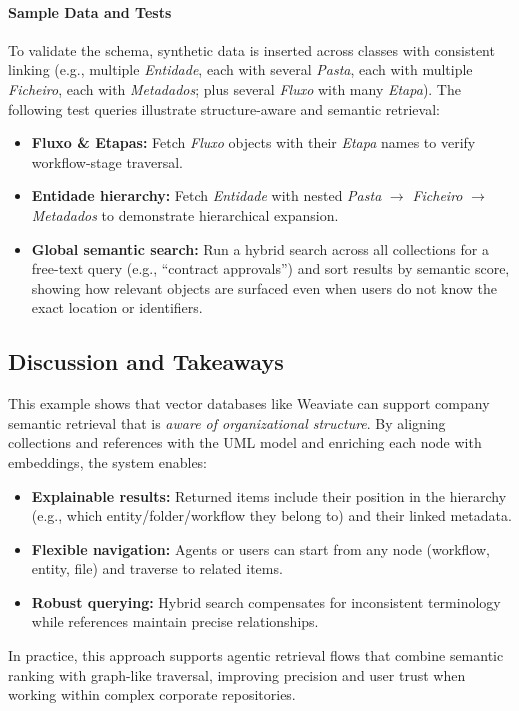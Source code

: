 \paragraph{Sample Data and Tests}
To validate the schema, synthetic data is inserted across classes with consistent linking (e.g., multiple \textit{Entidade}, each with several \textit{Pasta}, each with multiple \textit{Ficheiro}, each with \textit{Metadados}; plus several \textit{Fluxo} with many \textit{Etapa}). The following test queries illustrate structure-aware and semantic retrieval:
\begin{itemize}
    \item \textbf{Fluxo \& Etapas:} Fetch \textit{Fluxo} objects with their \textit{Etapa} names to verify workflow-stage traversal.
    \item \textbf{Entidade hierarchy:} Fetch \textit{Entidade} with nested \textit{Pasta} \(\rightarrow\) \textit{Ficheiro} \(\rightarrow\) \textit{Metadados} to demonstrate hierarchical expansion.
    \item \textbf{Global semantic search:} Run a hybrid search across all collections for a free-text query (e.g., “contract approvals”) and sort results by semantic score, showing how relevant objects are surfaced even when users do not know the exact location or identifiers.
\end{itemize}

\subsection{Discussion and Takeaways}
This example shows that vector databases like Weaviate can support company semantic retrieval that is \emph{aware of organizational structure}. By aligning collections and references with the UML model and enriching each node with embeddings, the system enables:
\begin{itemize}
    \item \textbf{Explainable results:} Returned items include their position in the hierarchy (e.g., which entity/folder/workflow they belong to) and their linked metadata.
    \item \textbf{Flexible navigation:} Agents or users can start from any node (workflow, entity, file) and traverse to related items.
    \item \textbf{Robust querying:} Hybrid search compensates for inconsistent terminology while references maintain precise relationships.
\end{itemize}
In practice, this approach supports agentic retrieval flows that combine semantic ranking with graph-like traversal, improving precision and user trust when working within complex corporate repositories.


